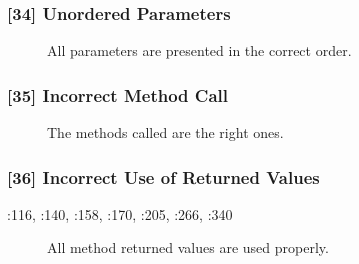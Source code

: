 \subsubsection{[34] Unordered Parameters}
\begin{description}
	\item[] All parameters are presented in the correct order.
\end{description}

\subsubsection{[35] Incorrect Method Call}
\begin{description}
	\item[] The methods called are the right ones.
\end{description}

\subsubsection{[36] Incorrect Use of Returned Values}
\begin{description}
	\item[:116, :140, :158, :170, :205, :266, :340] All method returned values are used properly.
\end{description}

